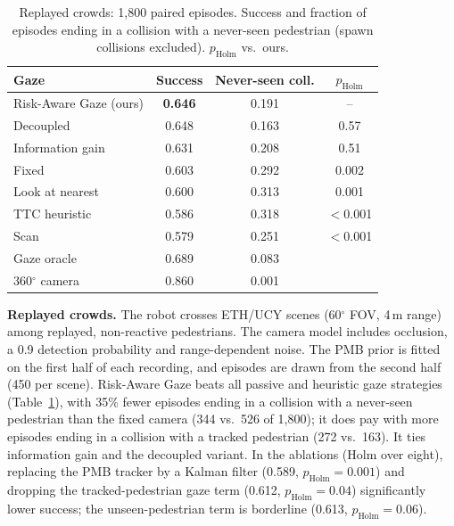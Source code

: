 \documentclass[conference]{IEEEtran}
\begin{document}
\begin{table}[t]
\centering
\caption{Replayed crowds: 1,800 paired episodes. Success and fraction of episodes ending in a collision with a never-seen pedestrian (spawn collisions excluded). $p_\text{Holm}$ vs.\ ours.}
\label{tab:replay}
\footnotesize
\begin{tabular}{lccc}
\toprule
Gaze & Success & Never-seen coll. & $p_\text{Holm}$ \\
\midrule
Risk-Aware Gaze (ours)  & \textbf{0.646} & 0.191 & -- \\
Decoupled          & 0.648 & 0.163 & 0.57 \\
Information gain   & 0.631 & 0.208 & 0.51 \\
Fixed              & 0.603 & 0.292 & 0.002 \\
Look at nearest    & 0.600 & 0.313 & 0.001 \\
TTC heuristic      & 0.586 & 0.318 & $<$0.001 \\
Scan               & 0.579 & 0.251 & $<$0.001 \\
\midrule
Gaze oracle        & 0.689 & 0.083 & \\
360$^\circ$ camera & 0.860 & 0.001 & \\
\bottomrule
\end{tabular}
\vspace{-3mm}
\end{table}

\textbf{Replayed crowds.} The robot crosses ETH/UCY scenes (60$^\circ$ FOV, 4\,m range) among replayed, non-reactive pedestrians. The camera model includes occlusion, a 0.9 detection probability and range-dependent noise. The PMB prior is fitted on the first half of each recording, and episodes are drawn from the second half (450 per scene). Risk-Aware Gaze beats all passive and heuristic gaze strategies (Table~\ref{tab:replay}), with 35\% fewer episodes ending in a collision with a never-seen pedestrian than the fixed camera (344 vs.\ 526 of 1,800); it does pay with more episodes ending in a collision with a tracked pedestrian (272 vs.\ 163). It ties information gain and the decoupled variant. In the ablations (Holm over eight), replacing the PMB tracker by a Kalman filter (0.589, $p_\text{Holm}{=}0.001$) and dropping the tracked-pedestrian gaze term (0.612, $p_\text{Holm}{=}0.04$) significantly lower success; the unseen-pedestrian term is borderline (0.613, $p_\text{Holm}{=}0.06$).
\end{document}
